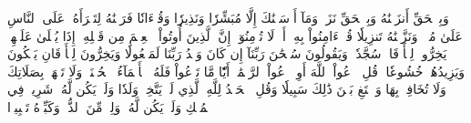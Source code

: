 وَبِٱلۡحَقِّ أَنزَلۡنَٰهُ وَبِٱلۡحَقِّ نَزَلَۗ وَمَآ أَرۡسَلۡنَٰكَ إِلَّا مُبَشِّرٗا وَنَذِيرٗا
وَقُرۡءَانٗا فَرَقۡنَٰهُ لِتَقۡرَأَهُۥ عَلَى ٱلنَّاسِ عَلَىٰ مُكۡثٖ وَنَزَّلۡنَٰهُ تَنزِيلٗا
قُلۡ ءَامِنُواْ بِهِۦٓ أَوۡ لَا تُؤۡمِنُوٓاْۚ إِنَّ ٱلَّذِينَ أُوتُواْ ٱلۡعِلۡمَ مِن قَبۡلِهِۦٓ إِذَا يُتۡلَىٰ عَلَيۡهِمۡ يَخِرُّونَۤ لِلۡأَذۡقَانِۤ سُجَّدٗاۤ
وَيَقُولُونَ سُبۡحَٰنَ رَبِّنَآ إِن كَانَ وَعۡدُ رَبِّنَا لَمَفۡعُولٗا
وَيَخِرُّونَ لِلۡأَذۡقَانِ يَبۡكُونَ وَيَزِيدُهُمۡ خُشُوعٗا۩
قُلِ ٱدۡعُواْ ٱللَّهَ أَوِ ٱدۡعُواْ ٱلرَّحۡمَٰنَۖ أَيّٗا مَّا تَدۡعُواْ فَلَهُ ٱلۡأَسۡمَآءُ ٱلۡحُسۡنَىٰۚ وَلَا تَجۡهَرۡ بِصَلَاتِكَ وَلَا تُخَافِتۡ بِهَا وَٱبۡتَغِ بَيۡنَ ذَٰلِكَ سَبِيلٗا
وَقُلِ ٱلۡحَمۡدُ لِلَّهِ ٱلَّذِي لَمۡ يَتَّخِذۡ وَلَدٗا وَلَمۡ يَكُن لَّهُۥ شَرِيكٞ فِي ٱلۡمُلۡكِ وَلَمۡ يَكُن لَّهُۥ وَلِيّٞ مِّنَ ٱلذُّلِّۖ وَكَبِّرۡهُ تَكۡبِيرَۢا